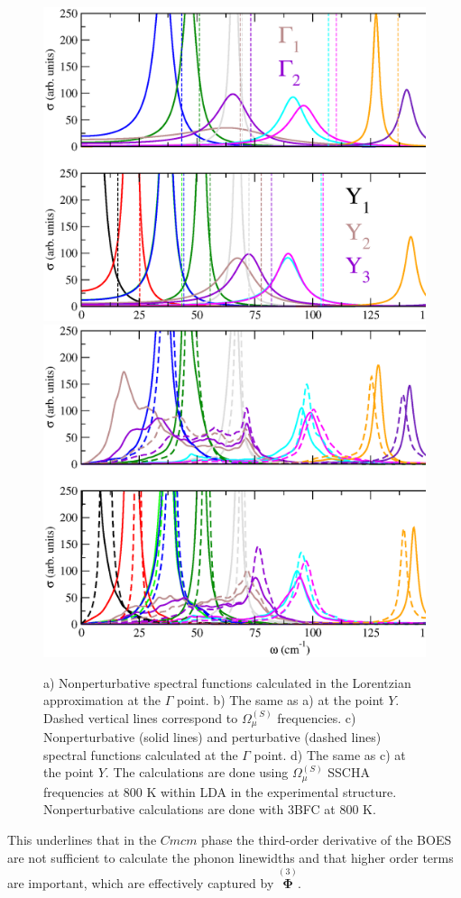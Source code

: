 \begin{figure}[th]
\begin{center}
\includegraphics[width=0.8\linewidth]{Figures/spectrum-lorentzian-snse.eps}
\includegraphics[width=0.8\linewidth]{Figures/spf-p-np-snse.eps}
\caption[Perturbative and nonperturbative spectral functions in SnSe.]{a) Nonperturbative spectral functions calculated in the Lorentzian approximation at the $\Gamma$ point. b) The same as a) at the point $Y$. Dashed vertical lines 
correspond to $\Omega^{(S)}_{\mu}$ frequencies. c) Nonperturbative (solid lines) and perturbative (dashed lines)
spectral functions calculated at the $\Gamma$ point. d) The same as c) at the point $Y$. The calculations are done 
using $\Omega^{(S)}_{\mu}$ SSCHA frequencies at $800$ K within LDA in the experimental structure. Nonperturbative 
calculations are done with 3BFC at $800$ K.}
\label{spf-p-np}
\end{center}
\end{figure}
This underlines that in the $Cmcm$ phase the third-order derivative of the BOES are not sufficient to calculate the phonon linewidths and that higher order terms are important, which are effectively 
captured by $\overset{(3)}{\boldsymbol{\Phi}}$. \\

